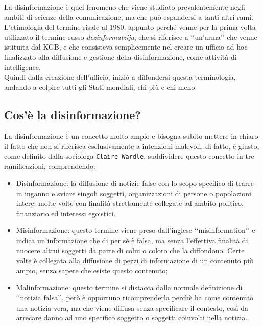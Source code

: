 \documentclass{article}
\begin{document}
\begin{justify}
    La disinformazione è quel fenomeno che viene studiato prevalentemente negli ambiti di scienze della comunicazione, ma che può espandersi a tanti altri rami.
    L'etimologia del termine risale al 1980, appunto perché venne per la prima volta utilizzato il termine russo \textit{dezinformatzija}, che si riferisce a ‘‘un'arma’’ che venne istituita dal KGB, e che consisteva semplicemente nel creare un ufficio ad hoc finalizzato alla diffusione e gestione della disinformazione, come attività di intelligence.\citep{DisWiki}\\
    Quindi dalla creazione dell'ufficio, iniziò a diffondersi questa terminologia, andando a colpire tutti gli Stati mondiali, chi più e chi meno.
\end{justify}

\centering\subsection{Cos'è la disinformazione?}

\begin{justify}
    La disinformazione è un concetto molto ampio e bisogna subito mettere in chiaro il fatto che non si riferisca esclusivamente a intenzioni malevoli, di fatto, è giusto, come definito dalla sociologa \texttt{Claire Wardle}, suddividere questo concetto in tre ramificazioni, comprendendo:
\begin{itemize}
    \item Disinformazione: la diffusione di notizie false con lo scopo specifico di trarre in inganno e sviare singoli soggetti, organizzazioni di persone o popolazioni intere: molte volte con finalità strettamente collegate ad ambito politico, finanziario ed interessi egoistici.
    \item Misinformazione: questo termine viene preso dall'inglese ‘‘misinformation’’ e indica un'informazione che di per sè è falsa, ma senza l'effettiva finalità di nuocere altrui soggetti da parte di colui o coloro che la diffondono. Certe volte è collegata alla diffusione di pezzi di informazione di un contenuto più ampio, senza sapere che esiste questo contenuto;
    \item Malinformazione: questo termine si distacca dalla normale definizione di ‘‘notizia falsa’’, però è opportuno ricomprenderla perchè ha come contenuto una notizia vera, ma che viene diffusa senza specificare il contesto, così da arrecare danno ad uno specifico soggetto o soggetti coinvolti nella notizia. \citep{wardle2018information}
\end{itemize}
\end{justify}
\end{document}
